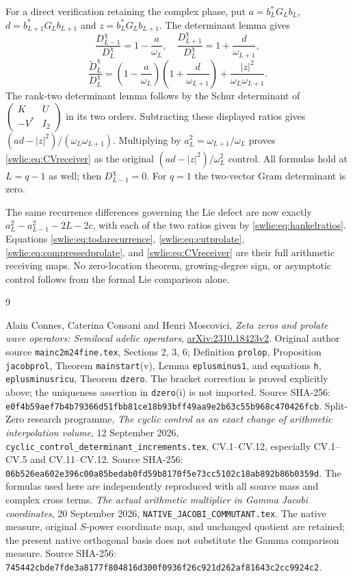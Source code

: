 \documentclass[11pt]{article}
\begin{document}
For a direct verification retaining the complex phase,
put $a=b_L^*G_Lb_L$, $d=b_{L+1}^*G_Lb_{L+1}$ and
$z=b_L^*G_Lb_{L+1}$. The determinant lemma gives
\[
 \frac{D_{L-1}^\chi}{D_L^\chi}=1-\frac a{\omega_L},
 \quad
 \frac{D_{L+1}^\chi}{D_L^\chi}=1+\frac d{\omega_{L+1}},
\]
\[
 \frac{\widetilde D_L^\chi}{D_L^\chi}
 =\left(1-\frac a{\omega_L}\right)
  \left(1+\frac d{\omega_{L+1}}\right)
                +\frac{|z|^2}{\omega_L\omega_{L+1}}.
\]
The rank-two determinant lemma follows by the
Schur determinant of
$\left(\begin{smallmatrix}K&U\\-V^*&I_2\end{smallmatrix}\right)$
in its two orders. Subtracting these displayed ratios
gives $(ad-|z|^2)/(\omega_L\omega_{L+1})$.
Multiplying by $a_L^2=\omega_{L+1}/\omega_L$
proves \eqref{swlie:eq:CVreceiver} as the original
$(ad-|z|^2)/\omega_L^2$ control. All formulas hold
at $L=q-1$ as well; then $D_{L-1}^\chi=0$.
For $q=1$ the two-vector Gram determinant is zero.

The same recurrence differences governing the Lie
defect are now exactly
$a_L^2-a_{L-1}^2-2L-2c$, with each of the two
ratios given by \eqref{swlie:eq:hankelratios}. Equations
\eqref{swlie:eq:todarecurrence}, \eqref{swlie:eq:cutprolate},
\eqref{swlie:eq:compressedprolate}, and \eqref{swlie:eq:CVreceiver}
are their full arithmetic receiving maps.
No zero-location theorem, growing-degree sign, or
asymptotic control follows from the formal Lie
comparison alone.

\begin{thebibliography}{9}\raggedright
{} Alain Connes, Caterina Consani and Henri Moscovici,
\emph{Zeta zeros and prolate wave operators: Semilocal adelic operators},
\href{https://arxiv.org/abs/2310.18423v2}{arXiv:2310.18423v2}.
Original author source \texttt{mainc2m24fine.tex}, Sections 2, 3, 6;
Definition \texttt{prolop}, Proposition \texttt{jacobprol},
Theorem \texttt{mainstart}(v), Lemma \texttt{eplusminus1},
and equations \texttt{h}, \texttt{eplusminusricu}, Theorem
\texttt{dzero}. The bracket correction is proved explicitly
above; the uniqueness assertion in \texttt{dzero}(i) is not
imported. Source SHA-256:
\texttt{e0f4b59aef7b4b79366d51fbb81ce18b93bff49aa9e2b63c55b968c470426fcb}.
 Split-Zero research programme,
\emph{The cyclic control as an exact change of arithmetic
interpolation volume}, 12 September 2026,
\texttt{cyclic\_control\_determinant\_increments.tex},
CV.1--CV.12, especially CV.1--CV.5 and CV.11--CV.12.
Source SHA-256:
\texttt{06b526ea602e396c00a85bedab0fd59b8170f5e73cc5102c18ab892b86b0359d}.
The formulas used here are independently reproduced
with all source mass and complex cross terms.
 \emph{The actual arithmetic multiplier in
Gamma Jacobi coordinates}, 20 September 2026,
\texttt{NATIVE\_JACOBI\_COMMUTANT.tex}. The native measure,
original $S$-power coordinate map, and unchanged quotient
are retained; the present native orthogonal basis does
not substitute the Gamma comparison measure.
Source SHA-256:
\texttt{745442cbde7fde3a8177f804816d300f0936f26c921d262af81643c2cc9924c2}.
\end{thebibliography}
\end{document}
